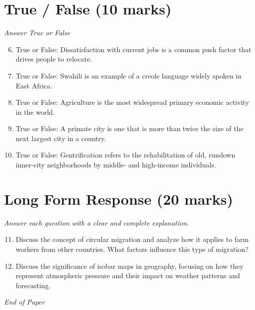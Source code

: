 \documentclass[12pt]{article}
\begin{document}
\section*{True / False (10 marks)}
\textit{Answer True or False}
\begin{enumerate}[label=\arabic*.]
\setcounter{enumi}{5}
\item True or False: Dissatisfaction with current jobs is a common push factor that drives people to relocate.
\item True or False: Swahili is an example of a creole language widely spoken in East Africa.
\item True or False: Agriculture is the most widespread primary economic activity in the world.
\item True or False: A primate city is one that is more than twice the size of the next largest city in a country.
\item True or False: Gentrification refers to the rehabilitation of old, rundown inner-city neighborhoods by middle- and high-income individuals.
\end{enumerate}

\section*{Long Form Response (20 marks)}
\textit{Answer each question with a clear and complete explanation.}
\begin{enumerate}[label=\arabic*.]
\setcounter{enumi}{10}
\item Discuss the concept of circular migration and analyze how it applies to farm workers from other countries. What factors influence this type of migration?
\item Discuss the significance of isobar maps in geography, focusing on how they represent atmospheric pressure and their impact on weather patterns and forecasting.
\end{enumerate}

\vfill
\noindent\textit{End of Paper}
\end{document}

